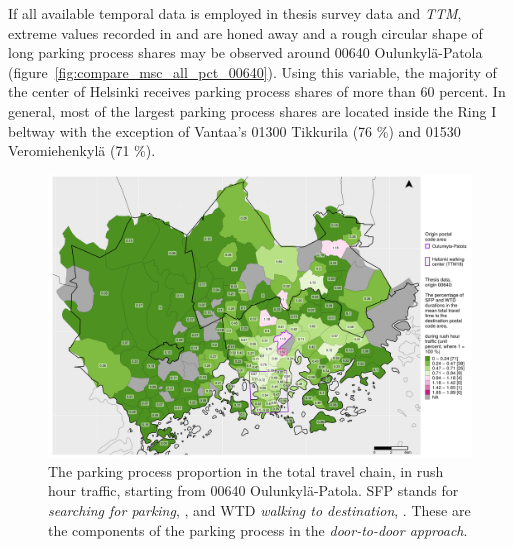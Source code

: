 If all available temporal data is employed in thesis survey data and \textit{TTM}, extreme values recorded in  and  are honed away and a rough circular shape of long parking process shares may be observed around 00640 Oulunkylä-Patola (figure~\ref{fig:compare_msc_all_pct_00640}). Using this variable, the majority of the center of Helsinki receives parking process shares of more than 60 percent. In general, most of the largest parking process shares are located inside the Ring I beltway with the exception of Vantaa's 01300 Tikkurila (76 \%) and 01530 Veromiehenkylä (71 \%).

\begin{figure}[H]%
    \centering
    \includegraphics[trim={0.9cm 0.3cm 0.25cm 0.3cm},clip,width=\textwidth]{images/compare_traveltimes_mapfill-msc_r_pct_fromzip-00640_28-09-2020.png}
    \caption[Parking process proportion from Oulunkylä-Patola, rush hour traffic]{The parking process proportion in the total travel chain, in rush hour traffic, starting from 00640 Oulunkylä-Patola. SFP stands for \textit{searching for parking}, , and WTD \textit{walking to destination}, . These are the components of the parking process in the \textit{door-to-door approach}.}%
    \label{fig:compare_msc_r_pct_00640}%
\end{figure}

